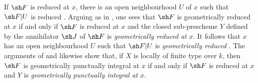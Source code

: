 If $\sh F$ is reduced at $x$, there is an open neighbourhood $U$ of
$x$ such that $\sh F|U$ is reduced .
Arguing as in , one sees that $\sh F$ is
geometrically reduced at $x$ if and only if $\sh F$ is reduced at $x$
and the closed sub-prescheme $Y$ defined by the annihilator $\sh J$ of
$\sh F$ is \emph{geometrically reduced at} $x$.
It follows that $x$ has an open neighbourhood $U$ such that
$\sh F|U$ is \emph{geometrically reduced} .
The arguments of  and  likewise show
that, if $X$ is locally of finite type over $k$, then $\sh F$ is
geometrically punctually integral at $x$ if and only if $\sh F$ is
reduced at $x$ and $Y$ is \emph{geometrically punctually integral at} $x$.
